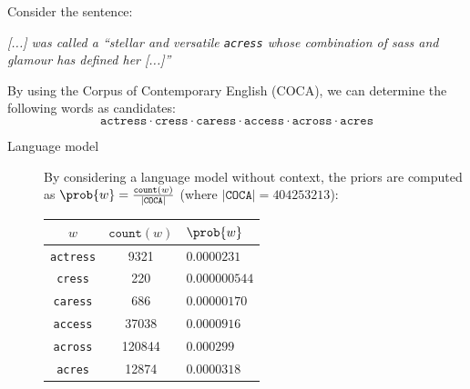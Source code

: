 \begin{example}
    Consider the sentence:
    \begin{center}
        \parbox{0.65\linewidth}{
            \textit{\textnormal{[...]} was called a ``stellar and versatile \texttt{acress} whose combination of sass and glamour has defined her \textnormal{[...]}''}
        }
    \end{center}
    By using the Corpus of Contemporary English (COCA), we can determine the following words as candidates:
    \[
        \texttt{actress} \cdot \texttt{cress} \cdot \texttt{caress} \cdot \texttt{access} \cdot \texttt{across} \cdot \texttt{acres}
    \]

    \begin{description}
        \item[Language model] By considering a language model without context, the priors are computed as $\prob{w} = \frac{\texttt{count}(w)}{\vert \texttt{COCA} \vert}$ (where $\vert \texttt{COCA} \vert = \num{404253213}$):
        \begin{table}[H]
            \centering
            \footnotesize
            \begin{tabular}{ccl}
                \toprule
                $w$ & $\texttt{count}(w)$ & $\prob{w}$ \\
                \midrule
                \texttt{actress}    & \num{9321}    & $0.0000231$   \\
                \texttt{cress}      & \num{220}     & $0.000000544$ \\
                \texttt{caress}     & \num{686}     & $0.00000170$  \\
                \texttt{access}     & \num{37038}   & $0.0000916$   \\
                \texttt{across}     & \num{120844}  & $0.000299$    \\
                \texttt{acres}      & \num{12874}   & $0.0000318$   \\
                \bottomrule
            \end{tabular}
        \end{table}


\end{description}
\end{example}
